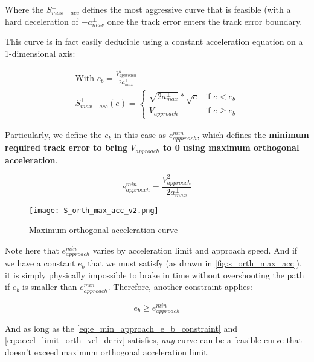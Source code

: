 Where the $S^{\perp}_{max-acc}$ defines the most aggressive curve that is feasible (with a hard deceleration of $-a^{\perp}_{max}$ once the track error enters the track error boundary.\newline

This curve is in fact easily deducible using a constant acceleration equation on a 1-dimensional axis:

\begin{align}
    \text{With } e_b = \frac{V_{approach}^{2}}{2a^{\perp}_{max}}\\
    S^{\perp}_{max-acc}(e)=\begin{cases}
        \sqrt{2a^{\perp}_{max}} * \sqrt{e}& \text{if $e < e_b$}\\
        V_{approach}& \text{if $e \geq e_b$}
    \end{cases}
    \label{eq:s_orth_max_acc}
\end{align}

Particularly, we define the $e_b$ in this case as $e^{min}_{approach}$, which defines the \textbf{minimum required track error to bring $V_{approach}$ to 0 using maximum orthogonal acceleration}.

\begin{equation}
    e^{min}_{approach} = \frac{V_{approach}^{2}}{2a^{\perp}_{max}}
\end{equation}

\begin{figure}[h]
\centering
\texttt{[image: S\_orth\_max\_acc\_v2.png]}
\caption{\label{fig:s_orth_max_acc}Maximum orthogonal acceleration curve}
\end{figure}

Note here that $e^{min}_{approach}$ varies by acceleration limit and approach speed. And if we have a constant $e_b$ that we must satisfy (as drawn in \autoref{fig:s_orth_max_acc}), it is simply physically impossible to brake in time without overshooting the path if $e_b$ is smaller than $e^{min}_{approach}$. Therefore, another constraint applies:

\begin{equation}
    e_b \geq e^{min}_{approach}
    \label{eq:e_min_approach_e_b_constraint}
\end{equation}

And as long as the \autoref{eq:e_min_approach_e_b_constraint} and \autoref{eq:accel_limit_orth_vel_deriv} satisfies, \textit{any} curve can be a feasible curve that doesn't exceed maximum orthogonal acceleration limit.

